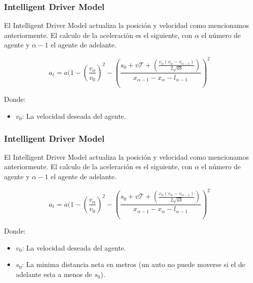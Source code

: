 \documentclass[10pt, compress]{beamer}
\begin{document}
\begin{frame}[fragile]

\frametitle{Intelligent Driver Model}
El Intelligent Driver Model actualiza la posici\'on y velocidad como mencionamos anteriormente. El calculo de la aceleraci\'on es el siguiente, con $\alpha$ el n\'umero de agente y $\alpha - 1$ el agente de adelante.

  \begin{equation*}
    a_t = a (1 - (\frac{v_\alpha}{v_0})^2 - (\frac{s_0 + v\mathcal{T} + (\frac{v_\alpha (v_\alpha - v_{\alpha-1})}{2\sqrt{ab}})}{x_{\alpha-1} - x_\alpha - l_{\alpha-1}})^2
  \end{equation*}

Donde:
\begin{itemize}
\item $v_0$: La velocidad deseada del agente.
\end{itemize}

\end{frame}

\begin{frame}[fragile]

\frametitle{Intelligent Driver Model}
El Intelligent Driver Model actualiza la posici\'on y velocidad como mencionamos anteriormente. El calculo de la aceleraci\'on es el siguiente, con $\alpha$ el n\'umero de agente y $\alpha - 1$ el agente de adelante.

  \begin{equation*}
    a_t = a (1 - (\frac{v_\alpha}{v_0})^2 - (\frac{s_0 + v\mathcal{T} + (\frac{v_\alpha (v_\alpha - v_{\alpha-1})}{2\sqrt{ab}})}{x_{\alpha-1} - x_\alpha - l_{\alpha-1}})^2
  \end{equation*}

Donde:
\begin{itemize}
\item $v_0$: La velocidad deseada del agente.
\item $s_0$: La minima distancia neta en metros (un auto no puede moverse si el de adelante esta a menos de $s_0$).
\end{itemize}

\end{frame}
\end{document}
